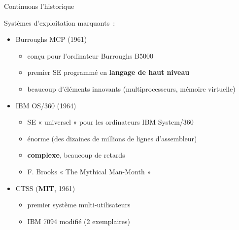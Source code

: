 \begin {frame} {Continuons l'historique}

    Systèmes d'exploitation marquants~:

    \begin {itemize}
	\item Burroughs MCP (1961)
	    \begin {itemize}
		\item conçu pour l'ordinateur Burroughs B5000
		\item premier SE programmé en \textbf {langage de
		    haut niveau}
		\item beaucoup d'éléments innovants (multiprocesseurs,
		    mémoire virtuelle)
	    \end {itemize}
	\item IBM OS/360 (1964)
	    \begin {itemize}
		\item SE « universel » pour les ordinateurs IBM System/360
		\item énorme (des dizaines de millions de lignes d'assembleur)
		\item \textbf {complexe}, beaucoup de retards
		\item F. Brooks « The Mythical Man-Month »
	    \end {itemize}
	\item CTSS (\textbf {MIT}, 1961)
	    \begin {itemize}
		\item premier système multi-utilisateurs
		\item IBM 7094 modifié (2 exemplaires)
	    \end {itemize}
    \end {itemize}

\end {frame}

